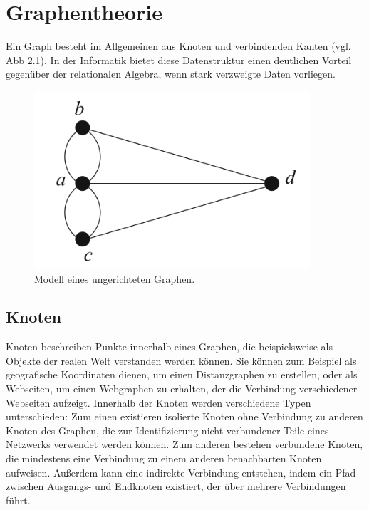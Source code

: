 \section{Graphentheorie} %
\label{sec:graphentheorie}
Ein Graph besteht im Allgemeinen aus Knoten und verbindenden Kanten (vgl. Abb 2.1). In der Informatik bietet diese Datenstruktur einen deutlichen Vorteil gegenüber der relationalen Algebra, wenn stark verzweigte Daten vorliegen.  \citep{graphTheory}

\begin{figure}[h!]
	\centering
	\includegraphics[scale=1]{Illustrations/graph.png}
	\caption{Modell eines ungerichteten Graphen. \citep{graphTheory}}
\end{figure}
\newpage
\subsection{Knoten} %
\label{sec:knoten}
Knoten beschreiben Punkte innerhalb eines Graphen, die beispielsweise als Objekte der realen Welt verstanden werden können. Sie können zum Beispiel als geografische Koordinaten dienen, um einen Distanzgraphen zu erstellen, oder als Webseiten, um einen Webgraphen zu erhalten, der die Verbindung verschiedener Webseiten aufzeigt. Innerhalb der Knoten werden verschiedene Typen unterschieden: Zum einen existieren isolierte Knoten ohne Verbindung zu anderen Knoten des Graphen, die zur Identifizierung nicht verbundener Teile eines Netzwerks verwendet werden können. Zum anderen bestehen verbundene Knoten, die mindestens eine Verbindung zu einem anderen benachbarten Knoten aufweisen. Außerdem kann eine indirekte Verbindung entstehen, indem ein Pfad zwischen Ausgangs- und Endknoten existiert, der über mehrere Verbindungen führt.  \citep{graphTheory} \citep{graphapplication}

